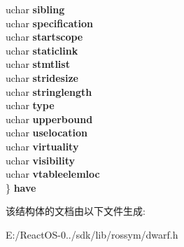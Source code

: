 \begin{DoxyCompactItemize}
\begin{tabbing}
\>uchar {\bfseries sibling}\\
\>uchar {\bfseries specification}\\
\>uchar {\bfseries startscope}\\
\>uchar {\bfseries staticlink}\\
\>uchar {\bfseries stmtlist}\\
\>uchar {\bfseries stridesize}\\
\>uchar {\bfseries stringlength}\\
\>uchar {\bfseries type}\\
\>uchar {\bfseries upperbound}\\
\>uchar {\bfseries uselocation}\\
\>uchar {\bfseries virtuality}\\
\>uchar {\bfseries visibility}\\
\>uchar {\bfseries vtableelemloc}\\
\} {\bfseries have}\\

\end{tabbing}\end{DoxyCompactItemize}


该结构体的文档由以下文件生成\+:\begin{DoxyCompactItemize}
\item 
E\+:/\+React\+O\+S-\/0../sdk/lib/rossym/dwarf.\+h\end{DoxyCompactItemize}

